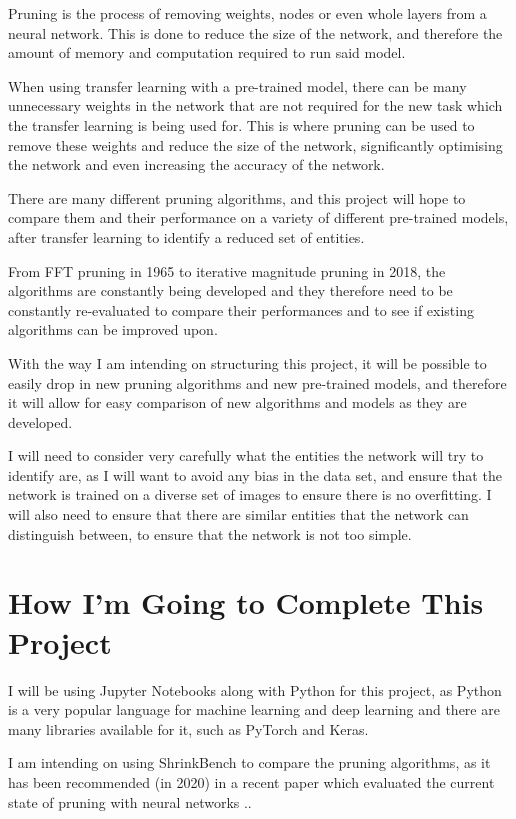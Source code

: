 \documentclass{article}
\begin{document}
Pruning is the process of removing weights, nodes or even whole layers from a neural network.
This is done to reduce the size of the network, and therefore the amount of memory and
computation required to run said model.

When using transfer learning with a pre-trained model, there can be many
unnecessary weights in the network that are not required for the new task
which the transfer learning is being used for. This is where pruning can be used
to remove these weights and reduce the size of the network, significantly
optimising the network and even increasing the accuracy of the network.

There are many different pruning algorithms, and this project will hope to compare
them and their performance on a variety of different pre-trained models, after
transfer learning to identify a reduced set of entities.

From FFT pruning in 1965\cite{FFT} to iterative magnitude pruning in 2018\cite{LotteryTicket},
the algorithms are constantly being developed and they therefore need to be constantly re-evaluated
to compare their performances and to see if existing algorithms can be improved upon.

With the way I am intending on structuring this project, it will be possible to
easily drop in new pruning algorithms and new pre-trained models, and therefore
it will allow for easy comparison of new algorithms and models as they are developed.

I will need to consider very carefully what the entities the network will try
to identify are, as I will want to avoid any bias in the data set, and
ensure that the network is trained on a diverse set of images to ensure there is no
overfitting. I will also need to ensure that there are similar entities that the
network can distinguish between, to ensure that the network is not too simple.

\pagebreak

\section{How I'm Going to Complete This Project}

I will be using Jupyter Notebooks\cite{Jupyter} along with Python for this project, as 
Python is a very popular language for machine learning and deep learning and there are many
libraries available for it, such as PyTorch\cite{PyTorch} and Keras\cite{Keras}.

I am intending on using ShrinkBench\cite{ShrinkBench} to compare the pruning algorithms,
as it has been recommended (in 2020) in a recent paper which evaluated the current state of pruning with neural networks
.\cite{DBLP:journals/corr/abs-2003-03033}.
\end{document}
